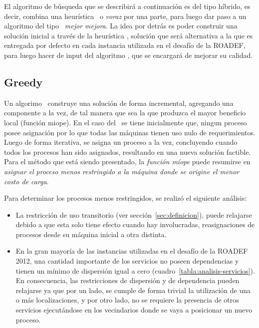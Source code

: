 \documentclass[../informe2.tex]{subfiles}
\begin{document}
El algoritmo de búsqueda que se describirá a continuación es del tipo híbrido, es decir, combina una heurística \greedy\ o \textit{voraz} por una parte, para luego dar paso a un algoritmo del tipo \hillc\  \textit{mejor mejora}. La idea por detrás es poder construir una solución inicial a través de la heurística \greedy, solución que será alternativa a la que es entregada por defecto en cada instancia utilizada en el desafío de la ROADEF, para luego hacer de input del algoritmo \hillc, que se encargará de mejorar su calidad.
\subsection{Greedy}
Un algorimo \greedy\ construye una solución de forma incremental, agregando una componente a la vez, de tal manera que sea la que produzca el mayor beneficio local (función miope). En el caso del \mrp\ se tiene inicialmente que, ningun proceso posee asignación por lo que todas las máquinas tienen uso nulo de requerimientos. Luego de forma iterativa, se asigna un proceso a la vez, concluyendo cuando todos los procesos han sido asignados, resultando en una nueva solución factible. Para el método que está siendo presentado, la \textit{función míope} puede resumirse en \textit{asignar el proceso menos restringido a la máquina donde se origine el menor costo de carga}. \par
\noindent Para determinar los procesos menos restringidos, se realizó el siguiente análisis:
\begin{itemize}
	\item La restricción de uso transitorio (ver sección~\ref{sec:definicion}), puede relajarse debido a que esta solo tiene efecto cuando hay involucradas, reasignaciones de procesos desde su máquina inicial a otra distinta.
	\item En la gran mayoría de las instancias utilizadas en el desafío de la ROADEF 2012, una cantidad importante de los servicios no poseen dependencias y tienen un mínimo de dispersión igual a cero (cuadro~\ref{tabla:analisis-servicios}). En consecuencia, las restricciones de dispersión y de dependencia pueden relajarse ya que por un lado, se cumple de forma trivial la utilización de una o más localizaciones, y por otro lado, no se requiere la presencia de otros servicios ejecutándose en los vecindarios donde se vaya a posicionar un nuevo proceso.
\end{itemize}
\end{document}

